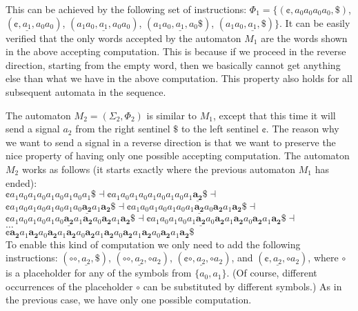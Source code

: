 \begin{example}
This can be achieved by the following set of instructions: $\Phi_1 = \{ (\cent, a_0 a_0 a_0 a_0, \$)$, $(\cent, \underline{a_1}, a_0 a_0)$, $(a_1 a_0, \underline{a_1}, a_0 a_0)$, $(a_1 a_0, \underline{a_1}, a_0 \$)$, $(a_1 a_0, \underline{a_1}, \$) \}$. It can be easily verified that the only words accepted by the automaton $M_1$ are the words shown in the above accepting computation. This is because if we proceed in the reverse direction, starting from the empty word, then we basically cannot get anything else than what we have in the above computation. This property also holds for all subsequent automata in the sequence.

The automaton $M_2 = (\Sigma_2, \Phi_2)$ is similar to $M_1$, except that this time it will send a signal $a_2$ from the right sentinel $\$$ to the left sentinel $\cent$. The reason why we want to send a signal in a reverse direction is that we want to preserve the nice property of having only one possible accepting computation. The automaton $M_2$ works as follows (it starts exactly where the previous automaton $M_1$ has ended):
\\

\indent $\cent a_1 a_0 a_1 a_0 a_1 a_0 a_1 a_0 a_1 \$ \dashv
\cent a_1 a_0 a_1 a_0 a_1 a_0 a_1 a_0 a_1 \underline{\mathbf{a_2}} \$ \dashv$\\
\indent $\cent a_1 a_0 a_1 a_0 a_1 a_0 a_1 a_0
\underline{\mathbf{a_2}} a_1 \mathbf{a_2} \$ \dashv
\cent a_1 a_0 a_1 a_0 a_1 a_0 a_1
\underline{\mathbf{a_2}} a_0 \mathbf{a_2} a_1 \mathbf{a_2} \$ \dashv$\\
\indent $\cent a_1 a_0 a_1 a_0 a_1 a_0
\underline{\mathbf{a_2}} a_1 \mathbf{a_2} a_0 \mathbf{a_2} a_1 \mathbf{a_2} \$ \dashv
\cent a_1 a_0 a_1 a_0 a_1 \underline{\mathbf{a_2}} a_0 \mathbf{a_2} a_1
\mathbf{a_2} a_0 \mathbf{a_2} a_1 \mathbf{a_2} \$ \dashv$\\
\indent $\ldots$\\
\indent $\cent \mathbf{a_2} a_1 \mathbf{a_2} a_0 \mathbf{a_2} a_1
\mathbf{a_2} a_0 \mathbf{a_2} a_1 \mathbf{a_2} a_0 \mathbf{a_2} a_1
\mathbf{a_2} a_0 \mathbf{a_2} a_1 \mathbf{a_2} \$$
\\

To enable this kind of computation we only need to add the following instructions: $(\circ \circ, \underline{a_2}, \$)$, $(\circ \circ, \underline{a_2}, \circ a_2)$, $(\cent \circ, \underline{a_2}, \circ a_2)$, and $(\cent, \underline{a_2}, \circ a_2)$, where $\circ$ is a placeholder for any of the symbols from $\{ a_0, a_1 \}$. (Of course, different occurrences of the placeholder $\circ$ can be substituted by  different symbols.) As in the previous case, we have only one possible computation.


\end{example}
